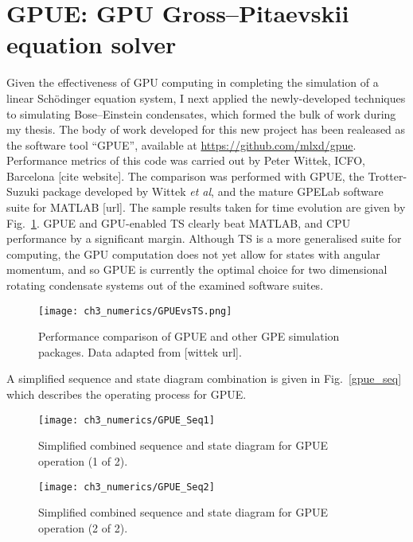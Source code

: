 \section{GPUE: GPU Gross--Pitaevskii equation solver}

Given the effectiveness of GPU computing in completing the simulation of a linear Sch\"odinger equation system, I next applied the newly-developed techniques to simulating Bose--Einstein condensates, which formed the bulk of work during my thesis. The body of work developed for this new project has been realeased as the software tool ``GPUE'', available at \url{https://github.com/mlxd/gpue}. Performance metrics of this code was carried out by Peter Wittek, ICFO, Barcelona [cite website]. The comparison was performed with GPUE, the Trotter-Suzuki package developed by Wittek \textit{et al}, and the mature GPELab software suite for MATLAB [url]. The sample results taken for time evolution are given by Fig.~\ref{fig:gpuevsts}. GPUE and GPU-enabled TS clearly beat MATLAB, and CPU performance by a significant margin. Although TS is a more generalised suite for computing, the GPU computation does not yet allow for states with angular momentum, and so GPUE is currently the optimal choice for two dimensional rotating condensate systems out of the examined software suites.

\begin{figure}[htb]
    \centering
    \texttt{[image: ch3\_numerics/GPUEvsTS.png]}
    \caption{Performance comparison of GPUE and other GPE simulation packages. Data adapted from [wittek url].}
    \label{fig:gpuevsts}
\end{figure}

A simplified sequence and state diagram combination is given in Fig.~\ref{gpue_seq} which describes the operating process for GPUE.

\begin{figure}[h]
    \centering
        \texttt{[image: ch3\_numerics/GPUE\_Seq1]}
    \caption{Simplified combined sequence and state diagram for GPUE operation (1 of 2).}
    \label{fig:gpue_seq}
\end{figure}
\begin{figure}[h]
    \centering
        \texttt{[image: ch3\_numerics/GPUE\_Seq2]}
    \caption{Simplified combined sequence and state diagram for GPUE operation (2 of 2).}
    \label{fig:gpue_seq}
\end{figure}

